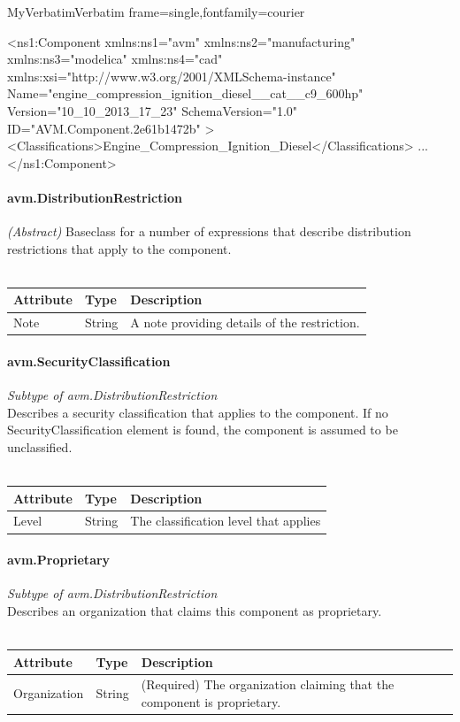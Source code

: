 \DefineVerbatimEnvironment%
  {MyVerbatim}{Verbatim}
  {frame=single,fontfamily=courier}
\begin{MyVerbatim}
<ns1:Component 
    xmlns:ns1="avm" xmlns:ns2="manufacturing" 
    xmlns:ns3="modelica" xmlns:ns4="cad" 
    xmlns:xsi="http://www.w3.org/2001/XMLSchema-instance" 
  Name="engine_compression_ignition_diesel__cat__c9_600hp" 
  Version="10_10_2013_17_23"
  SchemaVersion="1.0"
  ID="AVM.Component.2e61b1472b"  >
    <Classifications>Engine_Compression_Ignition_Diesel</Classifications>
    ...
</ns1:Component>
\end{MyVerbatim}

\paragraph{avm.DistributionRestriction}
\textit{(Abstract)} Baseclass for a number of expressions that describe distribution restrictions that apply to the component.
\\ \\
\begin{tabular}{ l l p{12.5cm} }
\textbf{Attribute} & \textbf{Type} & \textbf{Description} \\ \hline
Note & String & A note providing details of the restriction. \\ \hline
\end{tabular}

\paragraph{avm.SecurityClassification}
\textit{Subtype of avm.DistributionRestriction}\\
Describes a security classification that applies to the component. If no SecurityClassification element is found, the component is assumed to be unclassified.
\\ \\
\begin{tabular}{ l l p{12.5cm} }
\textbf{Attribute} & \textbf{Type} & \textbf{Description} \\ \hline
Level & String & The classification level that applies \\ \hline
\end{tabular}

\paragraph{avm.Proprietary}
\textit{Subtype of avm.DistributionRestriction}\\
Describes an organization that claims this component as proprietary.
\\ \\
\begin{tabular}{ l l p{12.5cm} }
\textbf{Attribute} & \textbf{Type} & \textbf{Description} \\ \hline
Organization & String & (Required) The organization claiming that the component is proprietary. \\ \hline
\end{tabular}

